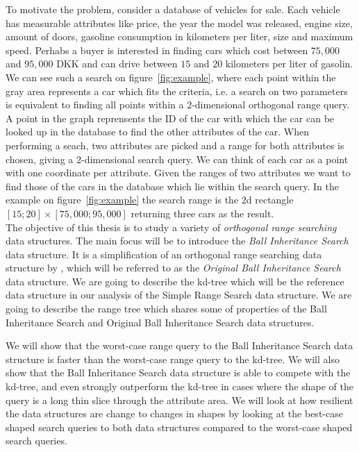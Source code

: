 \noindent To motivate the problem, consider a database of vehicles for sale. Each vehicle has measurable attributes like price, the year the model was released, engine size, amount of doors, gasoline consumption in kilometers per liter, size  and maximum speed. Perhabs a buyer is interested in finding cars which cost between $75,000$ and $95,000$ DKK and can drive between $15$ and $20$ kilometers per liter of gasolin. We can see such a search on figure~\ref{fig:example}, where each point within the gray area represents a car which fits the criteria, i.e. a search on two parameters is equivalent to finding all points within a $2$-dimensional orthogonal range query. A point in the graph reprensents the ID of the car with which the car can be looked up in the database to find the other attributes of the car. When performing a seach, two attributes are picked and a range for both attributes is chosen, giving a $2$-dimensional search query. We can think of each car as a point with one coordinate per attribute. Given the ranges of two attributes we want to find those of the cars in the database which lie within the search query. In the example on figure~\ref{fig:example} the search range is the $2$d rectangle $[15;20] \times [75,000;95,000]$ returning three cars as the result. \\

The objective of this thesis is to study a variety of \emph{orthogonal range searching} data structures. The main focus will be to introduce the \emph{Ball Inheritance Search} data structure. It is a simplification of an orthogonal range searching data structure by \citet{chanetal}, which will be referred to as the \emph{Original Ball Inheritance Search} data structure. We are going to describe the kd-tree which will be the reference data structure in our analysis of the Simple Range Search data structure. We are going to describe the range tree which shares some of properties of the Ball Inheritance Search and Original Ball Inheritance Search data structures.

We will show that the worst-case range query to the Ball Inheritance Search data structure is faster than the worst-case range query to the kd-tree. We will also show that the Ball Inheritance Search data structure is able to compete with the kd-tree, and even strongly outperform the kd-tree in cases where the shape of the query is a long thin slice through the attribute area. We will look at how resilient the data structures are change to changes in shapes by looking at the best-case shaped search queries to both data structures compared to the worst-case shaped search queries. \\ 


